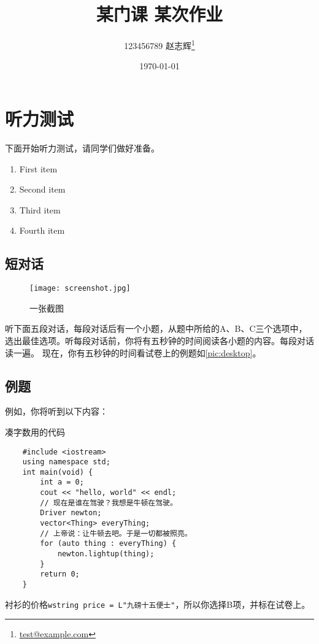 \documentclass{dreamClass}
\title{\heiti\textbf{某门课 \quad 某次作业}}
\author{123456789 \quad 赵志辉\thanks{\href{mailto:test@example.com}{test@example.com}}}
\affil{九乡河文理学院}
\date{\today}
\begin{document}
\maketitle
\thispagestyle{empty}

\section{听力测试}
下面开始听力测试，请同学们做好准备。
\begin{enumerate}[label=\large\protect\textcircled{\small\arabic*}]
    \item First item
    \item Second item
    \item Third item
    \item Fourth item
\end{enumerate}

\subsection{短对话}
\begin{figure}
    \centering
    \texttt{[image: screenshot.jpg]}
    \caption{一张截图}\label{pic:desktop}
\end{figure}
听下面五段对话，每段对话后有一个小题，从题中所给的A、B、C三个选项中，选出最佳选项。听每段对话前，你将有五秒钟的时间阅读各小题的内容。每段对话读一遍。
现在，你有五秒钟的时间看试卷上的例题如\autoref{pic:desktop}。
\subsection{例题}
例如，你将听到以下内容：
\begin{listing}
    \caption{凑字数用的代码\label{code:junk}}
    \begin{verbatim}
    #include <iostream>
    using namespace std;
    int main(void) {
        int a = 0;
        cout << "hello, world" << endl;
        // 现在是谁在驾驶？我想是牛顿在驾驶。
        Driver newton;
        vector<Thing> everyThing;
        // 上帝说：让牛顿去吧。于是一切都被照亮。
        for (auto thing : everyThing) {
            newton.lightup(thing);
        }
        return 0;
    }
    \end{verbatim}
\end{listing}
衬衫的价格\texttt{wstring price = L"九磅十五便士"}，所以你选择B项，并标在试卷上。
\end{document}
